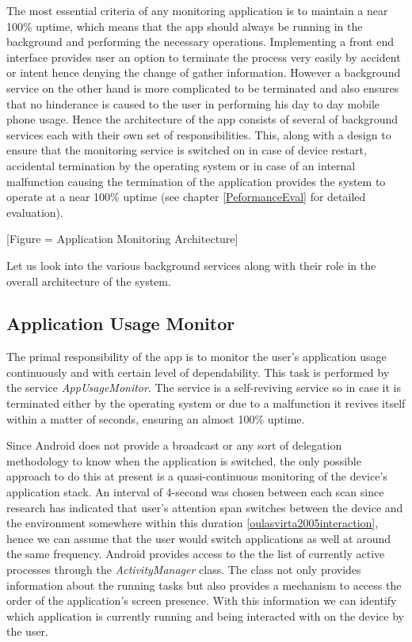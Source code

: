 \documentclass[12pt]{report}
\begin{document}
The most essential criteria of any monitoring application is to maintain a near 100\% uptime, which means that the app should always be running in the background and performing the necessary operations. Implementing a front end interface provides user an option to terminate the process very easily by accident or intent hence denying the change of gather information. However a background service on the other hand is more complicated to be terminated and also ensures that no hinderance is caused to the user in performing his day to day mobile phone usage. Hence the architecture of the app consists of several of background services each with their own set of responsibilities. This, along with a design to ensure that the monitoring service is switched on in case of device restart, accidental termination by the operating system or in case of an internal malfunction causing the termination of the application provides the system to operate at a near 100\% uptime (see chapter \ref{PeformanceEval} for detailed evaluation).

[Figure = Application Monitoring Architecture]

Let us look into the various background services along with their role in the overall architecture of the system.
 
\subsection{Application Usage Monitor}

The primal responsibility of the app is to monitor the user's application usage continuously and with certain level of dependability. This task is performed by the service \textit{AppUsageMonitor}. The service is a self-reviving service so in case it is terminated either by the operating system or due to a malfunction it revives itself within a matter of seconds, ensuring an almost 100\% uptime.

Since Android does not provide a broadcast or any sort of delegation methodology to know when the application is switched, the only possible approach to do this at present is a quasi-continuous monitoring of the device's application stack. An interval of 4-second was chosen between each scan since research has indicated that user's attention span switches between the device and the environment somewhere within this duration \ref{oulasvirta2005interaction}, hence we can assume that the user would switch applications as well at around the same frequency. Android provides access to the the list of currently active processes through the \textit{ActivityManager} class. The class not only provides information about the running tasks but also provides a mechanism to access the order of the application's screen presence. With this information we can identify which application is currently running and being interacted with on the device by the user.
\end{document}
